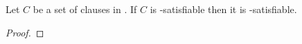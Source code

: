 \begin{theorem}
    Let $C$ be a set of clauses in . If $C$ is \ckn-satisfiable then it
    is -satisfiable.
\end{theorem}
\begin{proof}
\end{proof}
